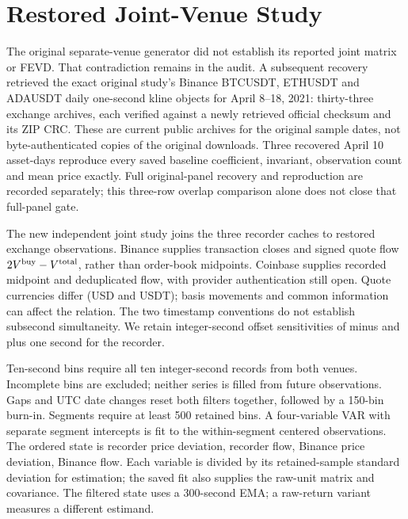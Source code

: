 \section{Restored Joint-Venue Study}
\label{sec:restored_joint}
The original separate-venue generator did not establish its reported joint matrix or FEVD. That contradiction remains in the audit. A subsequent recovery retrieved the exact original study's Binance BTCUSDT, ETHUSDT and ADAUSDT daily one-second kline objects for April 8--18, 2021: thirty-three exchange archives, each verified against a newly retrieved official checksum and its ZIP CRC. These are current public archives for the original sample dates, not byte-authenticated copies of the original downloads. Three recovered April 10 asset-days reproduce every saved baseline coefficient, invariant, observation count and mean price exactly. Full original-panel recovery and reproduction are recorded separately; this three-row overlap comparison alone does not close that full-panel gate.

The new independent joint study joins the three recorder caches to restored exchange observations. Binance supplies transaction closes and signed quote flow $2V^{\rm buy}-V^{\rm total}$, rather than order-book midpoints. Coinbase supplies recorded midpoint and deduplicated flow, with provider authentication still open. Quote currencies differ (USD and USDT); basis movements and common information can affect the relation. The two timestamp conventions do not establish subsecond simultaneity. We retain integer-second offset sensitivities of minus and plus one second for the recorder.

Ten-second bins require all ten integer-second records from both venues. Incomplete bins are excluded; neither series is filled from future observations. Gaps and UTC date changes reset both filters together, followed by a 150-bin burn-in. Segments require at least 500 retained bins. A four-variable VAR with separate segment intercepts is fit to the within-segment centered observations. The ordered state is recorder price deviation, recorder flow, Binance price deviation, Binance flow. Each variable is divided by its retained-sample standard deviation for estimation; the saved fit also supplies the raw-unit matrix and covariance. The filtered state uses a 300-second EMA; a raw-return variant measures a different estimand.

